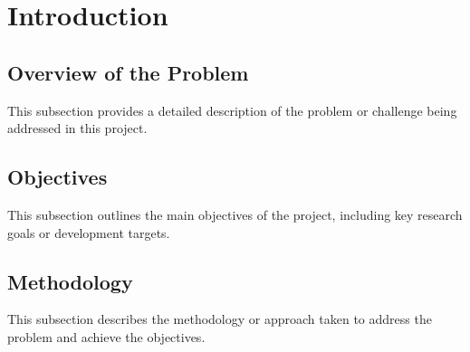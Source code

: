 
% 

\section{Introduction}  %

\subsection{Overview of the Problem}
This subsection provides a detailed description of the problem or challenge being addressed in this project.

\subsection{Objectives}
This subsection outlines the main objectives of the project, including key research goals or development targets.

\subsection{Methodology}
This subsection describes the methodology or approach taken to address the problem and achieve the objectives.

\endinput  %
